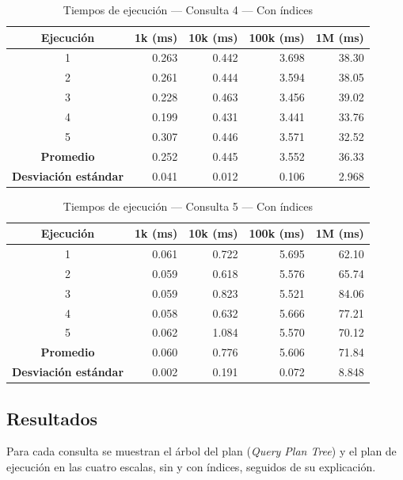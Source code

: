 \begin{table}[H]
\centering
\small
\caption{Tiempos de ejecución --- Consulta 4 --- Con índices}
\begin{tabular}{|c|r|r|r|r|}
\hline
\textbf{Ejecución} & \textbf{1k (ms)} & \textbf{10k (ms)} & \textbf{100k (ms)} & \textbf{1M (ms)} \\ \hline
1 & 0.263 & 0.442 & 3.698 & 38.30 \\ \hline
2 & 0.261 & 0.444 & 3.594 & 38.05 \\ \hline
3 & 0.228 & 0.463 & 3.456 & 39.02 \\ \hline
4 & 0.199 & 0.431 & 3.441 & 33.76 \\ \hline
5 & 0.307 & 0.446 & 3.571 & 32.52 \\ \hline
\textbf{Promedio} & 0.252 & 0.445 & 3.552 & 36.33 \\ \hline
\textbf{Desviación estándar} & 0.041 & 0.012 & 0.106 & 2.968 \\ \hline
\end{tabular}

\end{table}

\begin{table}[H]
\centering
\small
\caption{Tiempos de ejecución --- Consulta 5 --- Con índices}
\begin{tabular}{|c|r|r|r|r|}
\hline
\textbf{Ejecución} & \textbf{1k (ms)} & \textbf{10k (ms)} & \textbf{100k (ms)} & \textbf{1M (ms)} \\ \hline
1 & 0.061 & 0.722 & 5.695 & 62.10 \\ \hline
2 & 0.059 & 0.618 & 5.576 & 65.74 \\ \hline
3 & 0.059 & 0.823 & 5.521 & 84.06 \\ \hline
4 & 0.058 & 0.632 & 5.666 & 77.21 \\ \hline
5 & 0.062 & 1.084 & 5.570 & 70.12 \\ \hline
\textbf{Promedio} & 0.060 & 0.776 & 5.606 & 71.84 \\ \hline
\textbf{Desviación estándar} & 0.002 & 0.191 & 0.072 & 8.848 \\ \hline
\end{tabular}

\end{table}


\subsection{Resultados}

Para cada consulta se muestran el árbol del plan (\textit{Query Plan Tree}) y el
plan de ejecución en las cuatro escalas, sin y con índices, seguidos de su
explicación.

